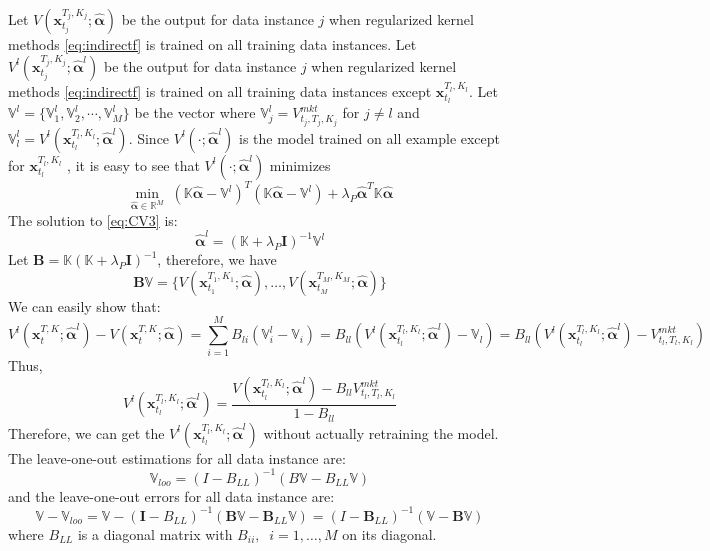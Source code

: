 \documentclass[letterpaper,12pt,titlepage,oneside,final]{book}
\numberwithin{equation}{section}
\theoremstyle{definition}
\newcommand{\vx}{\mathbf{x}}
\newcommand{\Real}{\mathbb{R}}
\newcommand{\valpha}{\pmb{\widehat{\alpha}}}
\newcommand{\vK}{\mathbb{K}}
\newcommand{\Vmkt}{V^{mkt}}
\newcommand{\vecVmkt}{\mathbb{V}}
\begin{document}
Let $V(\vx_{t_j}^{T_j,K_j}; \valpha)$ be the output for data instance $j$ when regularized kernel methods \eqref{eq:indirectf} is trained on all training data instances. Let $V^l(\vx_{t_j}^{T_j,K_j}; \valpha^l)$  be the output for data instance $j$ when regularized kernel methods \eqref{eq:indirectf} is trained on all training data instances except $\vx_{t_l}^{T_l,K_l}$. 
Let $\vecVmkt^l=\{\vecVmkt^l_1,\vecVmkt^l_2,\cdots,\vecVmkt^l_M\}$ be the vector where $\vecVmkt^l_{j} = \Vmkt_{t_j,T_j,K_j}$ for $j \neq l$ and $\vecVmkt^l_l = V^l(\vx_{t_l}^{T_l,K_l}; \valpha^l)$. Since $V^l(\cdot; \valpha^l)$ is the model trained on all example except for $\vx_{t_l}^{T_l,K_l}$ , it is easy to see that $V^l(\cdot; \valpha^l)$  minimizes
\begin{equation}
\min_{\valpha \in \Real^M} \; ( \vK \valpha - \vecVmkt^l)^T ( \vK \valpha -\vecVmkt^l)+ \lambda_P \valpha^T\vK\valpha
\label{eq:CV3}
\end{equation}
The solution to \eqref{eq:CV3} is:
\[
\valpha^l  =(\vK+\lambda_P \pmb{I})^{-1}\vecVmkt^l
\]
Let $\pmb{B}=\vK (\vK+\lambda_P \pmb{I})^{-1}$, therefore, we have 
\[\pmb{B}\vecVmkt=\{
	V(\vx_{t_1}^{T_1,K_1}; \valpha),
	\dots,
	V(\vx_{t_M}^{T_M,K_M}; \valpha)
	\}
\]
We can easily show that:
\[
	V^l(\vx_{t}^{T,K}; \valpha^l)-V(\vx_{t}^{T,K}; \valpha)=\sum_{i=1}^M B_{li}(\vecVmkt_i^l-\vecVmkt_i)=B_{ll}(V^l(\vx_{t_l}^{T_l,K_l}; \valpha^l)-\vecVmkt_l)=B_{ll}(V^l(\vx_{t_l}^{T_l,K_l}; \valpha^l)-\Vmkt_{t_l,T_l,K_l})
\]
Thus,
\begin{equation} \label{eq:fastCV}
	V^l(\vx_{t_l}^{T_l,K_l}; \valpha^l)=
	\frac{V(\vx_{t_l}^{T_l,K_l}; \valpha^l)-B_{ll}\Vmkt_{t_l,T_l,K_l}}
	{1-B_{ll}}
\end{equation}
Therefore, we can get the $V^l(\vx_{t_l}^{T_l,K_l}; \valpha^l)$  without actually retraining the model. The leave-one-out estimations for all data instance are:
\begin{equation} \label{eq:fastCV2}
\vecVmkt_{loo}=(I-B_{LL})^{-1}(B\vecVmkt-B_{LL}\vecVmkt)
\end{equation}
and the leave-one-out errors for all data instance are:
\begin{equation} \label{eq:fastCV3}
\vecVmkt-\vecVmkt_{loo}=\vecVmkt-(\pmb{I}-B_{LL})^{-1}(\pmb{B}\vecVmkt-\pmb{B}_{LL}\vecVmkt)=(I-\pmb{B}_{LL})^{-1}(\vecVmkt-\pmb{B}\vecVmkt)
\end{equation}
where $B_{LL}$ is a diagonal matrix with $B_{ii},\;\; i=1,\dots,M$ on its diagonal.
\end{document}

